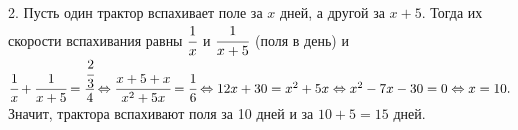 2. Пусть один трактор вспахивает поле за $x$ дней, а другой за $x+5.$ Тогда их скорости вспахивания равны $\cfrac{1}{x}$ и $\cfrac{1}{x+5}$ (поля в день) и $\cfrac{1}{x}+\cfrac{1}{x+5}=\cfrac{\cfrac{2}{3}}{4}\Leftrightarrow \cfrac{x+5+x}{x^2+5x}=\cfrac{1}{6}\Leftrightarrow
12x+30=x^2+5x\Leftrightarrow x^2-7x-30=0\Leftrightarrow x=10.$ Значит, трактора вспахивают поля за 10 дней и за $10+5=15$ дней.\\
